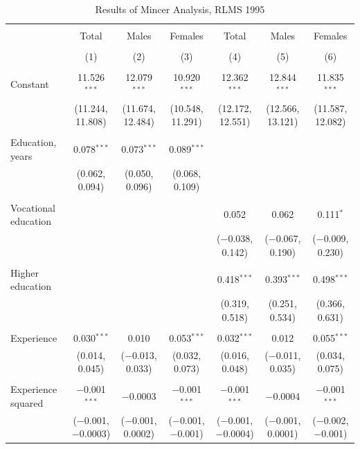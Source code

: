 \documentclass[alpha-refs]{wiley-article-01g}
\begin{document}
\begin{landscape}

\fontsize{9}{11}
\selectfont

\begin{table}[!htbp] \centering 
\renewcommand{\arraystretch}{1.0}
  \caption{Results of Mincer Analysis, RLMS 1995} 
  \label{} 
\begin{tabular}{@{\extracolsep{5pt}}lcccccc} 
\\[-.8ex]\hline 
\hline \\[-.8ex] 
 & Total & Males & Females & Total & Males & Females \\ 
\\[-.8ex] & (1) & (2) & (3) & (4) & (5) & (6)\\ 
\hline \\[-.8ex] 
 Constant & 11.526$^{***}$ & 12.079$^{***}$ & 10.920$^{***}$ & 12.362$^{***}$ & 12.844$^{***}$ & 11.835$^{***}$ \\ 
  & (11.244, 11.808) & (11.674, 12.484) & (10.548, 11.291) & (12.172, 12.551) & (12.566, 13.121) & (11.587, 12.082) \\ 
  & & & & & & \\ 
 Education, years & 0.078$^{***}$ & 0.073$^{***}$ & 0.089$^{***}$ &  &  &  \\ 
  & (0.062, 0.094) & (0.050, 0.096) & (0.068, 0.109) &  &  &  \\ 
  & & & & & & \\ 
 Vocational education &  &  &  & 0.052 & 0.062 & 0.111$^{*}$ \\ 
  &  &  &  & ($-$0.038, 0.142) & ($-$0.067, 0.190) & ($-$0.009, 0.230) \\ 
  & & & & & & \\ 
 Higher education &  &  &  & 0.418$^{***}$ & 0.393$^{***}$ & 0.498$^{***}$ \\ 
  &  &  &  & (0.319, 0.518) & (0.251, 0.534) & (0.366, 0.631) \\ 
  & & & & & & \\ 
 Experience & 0.030$^{***}$ & 0.010 & 0.053$^{***}$ & 0.032$^{***}$ & 0.012 & 0.055$^{***}$ \\ 
  & (0.014, 0.045) & ($-$0.013, 0.033) & (0.032, 0.073) & (0.016, 0.048) & ($-$0.011, 0.035) & (0.034, 0.075) \\ 
  & & & & & & \\ 
 Experience squared & $-$0.001$^{***}$ & $-$0.0003 & $-$0.001$^{***}$ & $-$0.001$^{***}$ & $-$0.0004 & $-$0.001$^{***}$ \\ 
  & ($-$0.001, $-$0.0003) & ($-$0.001, 0.0002) & ($-$0.001, $-$0.001) & ($-$0.001, $-$0.0004) & ($-$0.001, 0.0001) & ($-$0.002, $-$0.001) \\ 

\end{tabular}
\end{table}
\end{landscape}
\end{document}
